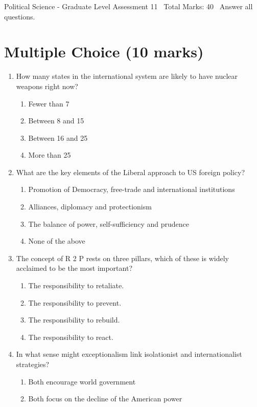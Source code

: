 \documentclass[12pt]{article}
\begin{document}
\begin{center}
Political Science - Graduate Level Assessment 11 \
Total Marks: 40 \
Answer all questions.
\end{center}

\section*{Multiple Choice (10 marks)}
\begin{enumerate}[label=\arabic*.]
\item How many states in the international system are likely to have nuclear weapons right now?
\begin{enumerate}[label=(\alph*)]
    \item Fewer than 7
    \item Between 8 and 15
    \item Between 16 and 25
    \item More than 25
\end{enumerate}
\item What are the key elements of the Liberal approach to US foreign policy?
\begin{enumerate}[label=(\alph*)]
    \item Promotion of Democracy, free-trade and international institutions
    \item Alliances, diplomacy and protectionism
    \item The balance of power, self-sufficiency and prudence
    \item None of the above
\end{enumerate}
\item The concept of R 2 P rests on three pillars, which of these is widely acclaimed to be the most important?
\begin{enumerate}[label=(\alph*)]
    \item The responsibility to retaliate.
    \item The responsibility to prevent.
    \item The responsibility to rebuild.
    \item The responsibility to react.
\end{enumerate}
\item In what sense might exceptionalism link isolationist and internationalist strategies?
\begin{enumerate}[label=(\alph*)]
    \item Both encourage world government
    \item Both focus on the decline of the American power

\end{enumerate}
\end{enumerate}
\end{document}
